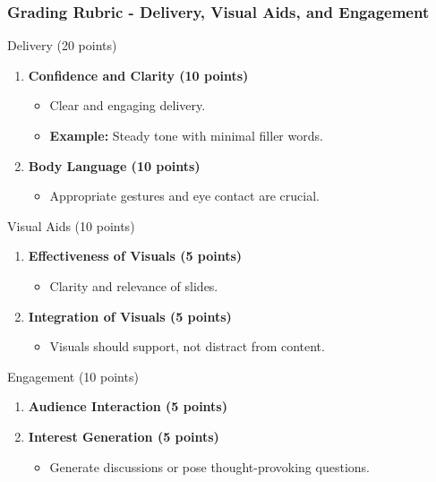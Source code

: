\documentclass[aspectratio=169]{beamer}
\begin{document}
\begin{frame}[fragile]
    \frametitle{Grading Rubric - Delivery, Visual Aids, and Engagement}
    \begin{block}{Delivery (20 points)}
        \begin{enumerate}
            \item \textbf{Confidence and Clarity (10 points)}
                \begin{itemize}
                    \item Clear and engaging delivery.
                    \item \textbf{Example:} Steady tone with minimal filler words.
                \end{itemize}
            \item \textbf{Body Language (10 points)}
                \begin{itemize}
                    \item Appropriate gestures and eye contact are crucial.
                \end{itemize}
        \end{enumerate}
    \end{block}

    \begin{block}{Visual Aids (10 points)}
        \begin{enumerate}
            \item \textbf{Effectiveness of Visuals (5 points)}
                \begin{itemize}
                    \item Clarity and relevance of slides.
                \end{itemize}
            \item \textbf{Integration of Visuals (5 points)}
                \begin{itemize}
                    \item Visuals should support, not distract from content.
                \end{itemize}
        \end{enumerate}
    \end{block}

    \begin{block}{Engagement (10 points)}
        \begin{enumerate}
            \item \textbf{Audience Interaction (5 points)}
            \item \textbf{Interest Generation (5 points)}
                \begin{itemize}
                    \item Generate discussions or pose thought-provoking questions.
                \end{itemize}
        \end{enumerate}
    \end{block}
\end{frame}
\end{document}
